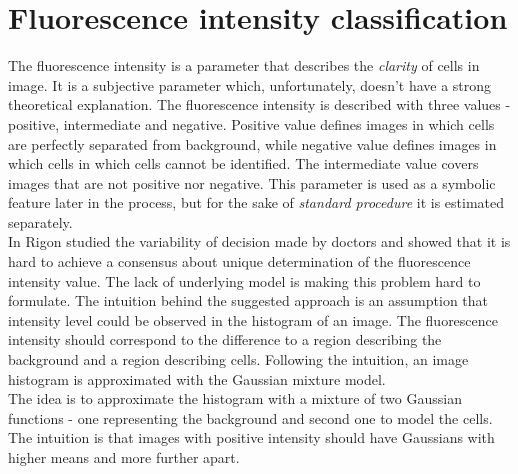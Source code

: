 
\chapter{Fluorescence intensity classification} %

\label{Chapter5} %



The fluorescence intensity is a parameter that describes the \textit{clarity} of cells in image. It is a subjective parameter which, unfortunately, doesn't have a strong theoretical explanation. The fluorescence intensity is described with three values - positive, intermediate and negative. Positive value defines images in which cells are perfectly separated from background, while negative value defines images in which cells in which cells cannot be identified. The intermediate value covers images that are not positive nor negative. This parameter is used as a symbolic feature later in the process, but for the sake of \textit{standard procedure} it is estimated separately. \\


In \cite{Rigon2007} Rigon studied the variability of decision made by doctors and showed that it is hard to achieve a consensus about unique determination of the fluorescence intensity value. The lack of underlying model is making this problem hard to formulate. The intuition behind the suggested approach is an assumption that intensity level could be observed in the histogram of an image. The fluorescence intensity should correspond to the difference to a region describing the background and a region describing cells. Following the intuition, an image histogram is approximated with the Gaussian mixture model. \\

The idea is to approximate the histogram with a mixture of two Gaussian functions - one representing the background and second one to model the cells. The intuition is that images with positive intensity should have Gaussians with higher means and more further apart. 



